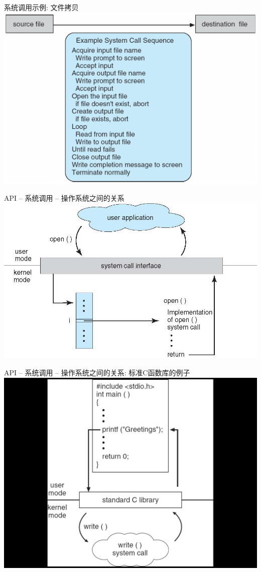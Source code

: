 \documentclass[xcolor=svgnames]{beamer}
\begin{document}
\begin{CJK*}{UTF8}{gbsn}
\begin{frame}{系统调用示例: 文件拷贝}
\includegraphics[width=1.0\textwidth]{syscall.png}
\end{frame}

\begin{frame}{API -- 系统调用 -- 操作系统之间的关系}
\includegraphics[width=1.0\textwidth]{syscall-os.jpg}
\end{frame}

\begin{frame}{API -- 系统调用 -- 操作系统之间的关系: 标准C函数库的例子}
\includegraphics[width=1.0\textwidth]{printf.png}
\end{frame}


\end{CJK*}
\end{document}
